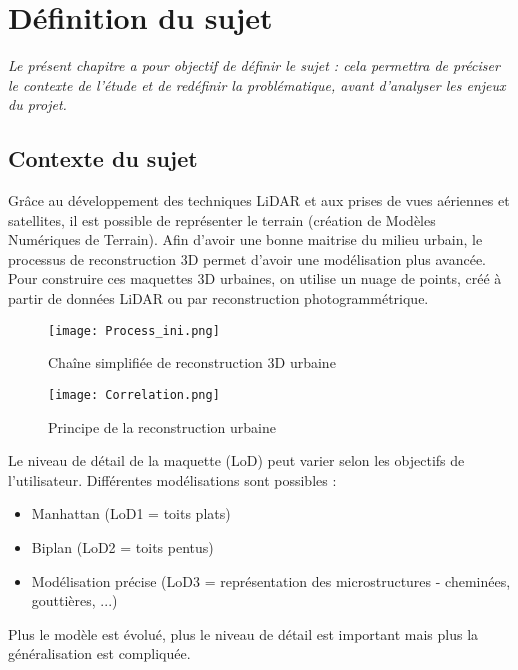 \chapter[Définition du sujet]{Définition du sujet}

\textit{Le présent chapitre a pour objectif de définir le sujet : cela permettra de préciser le contexte de l'étude et de redéfinir la problématique, avant d'analyser les enjeux du projet. }

\section{Contexte du sujet}

Grâce au développement des techniques LiDAR et aux prises de vues aériennes et satellites, il est possible de représenter le terrain (création de Modèles Numériques de Terrain). Afin d'avoir une bonne maitrise du milieu urbain, le processus de reconstruction 3D permet d'avoir une modélisation plus avancée. Pour construire ces maquettes 3D urbaines, on utilise un nuage de points, créé à partir de données LiDAR ou par reconstruction photogrammétrique. \newline

\begin{figure}[H]
	\begin{center}
		\texttt{[image: Process\_ini.png]}  \\
		\caption[Chaîne simplifiée de reconstruction 3D urbaine]{Chaîne simplifiée de reconstruction 3D urbaine}
		\label{fig:recons3D}
	\end{center}
\end{figure}

\begin{figure}[H]
	\begin{center}
		\texttt{[image: Correlation.png]}  \\
		\caption[Principe de la reconstruction urbaine]{Principe de la reconstruction urbaine}
		\label{fig:correlobj}
	\end{center}
\end{figure}

\newpage
Le niveau de détail de la maquette (LoD) peut varier selon les objectifs de l'utilisateur. Différentes modélisations sont possibles : 
\begin{itemize}[label=$\rightarrow$]
	\item Manhattan (LoD1 = toits plats)
	\item Biplan (LoD2 = toits pentus)
	\item Modélisation précise (LoD3 = représentation des microstructures - cheminées, gouttières, ...) 
\end{itemize}
Plus le modèle est évolué, plus le niveau de détail est important mais plus la généralisation est compliquée.\newline


